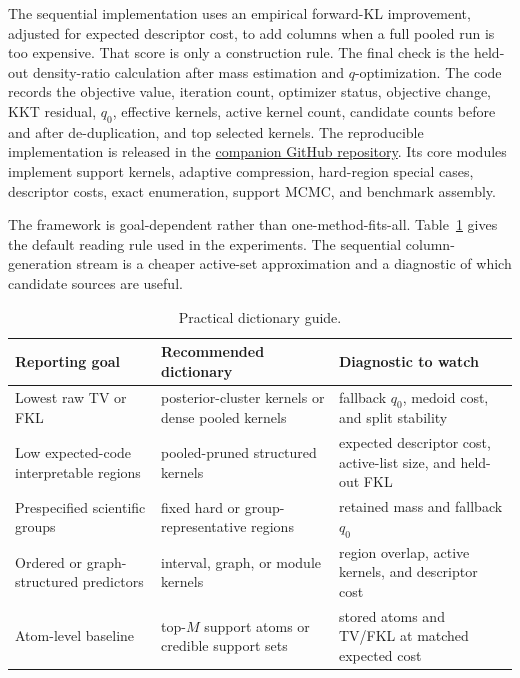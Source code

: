 \documentclass[twoside,11pt]{article}
\begin{document}
The sequential implementation uses an empirical forward-KL improvement, adjusted for expected descriptor cost, to add columns when a full pooled run is too expensive. That score is only a construction rule. The final check is the held-out density-ratio calculation after mass estimation and \(q\)-optimization. The code records the objective value, iteration count, optimizer status, objective change, KKT residual, \(q_0\), effective kernels, active kernel count, candidate counts before and after de-duplication, and top selected kernels. The reproducible implementation is released in the \href{https://github.com/lihanqing1997/bayesian-model-averaging-under-predictor-redundancy}{companion GitHub repository}. Its core modules implement support kernels, adaptive compression, hard-region special cases, descriptor costs, exact enumeration, support MCMC, and benchmark assembly.

The framework is goal-dependent rather than one-method-fits-all. Table~\ref{tab:dictionaryguide} gives the default reading rule used in the experiments. The sequential column-generation stream is a cheaper active-set approximation and a diagnostic of which candidate sources are useful.

\begin{table}[!htbp]
\centering
\small
\begin{tabularx}{\textwidth}{@{}>{\raggedright\arraybackslash}m{}
>{\raggedright\arraybackslash}m{}
>{\raggedright\arraybackslash}X@{}}
\toprule
Reporting goal & Recommended dictionary & Diagnostic to watch \\
\midrule
Lowest raw TV or FKL & posterior-cluster kernels or dense pooled kernels & fallback \(q_0\), medoid cost, and split stability \\
Low expected-code interpretable regions & pooled-pruned structured kernels & expected descriptor cost, active-list size, and held-out FKL \\
Prespecified scientific groups & fixed hard or group-representative regions & retained mass and fallback \(q_0\) \\
Ordered or graph-structured predictors & interval, graph, or module kernels & region overlap, active kernels, and descriptor cost \\
Atom-level baseline & top-\(M\) support atoms or credible support sets & stored atoms and TV/FKL at matched expected cost \\
\bottomrule
\end{tabularx}
\caption{Practical dictionary guide.}
\label{tab:dictionaryguide}
\end{table}
\end{document}
